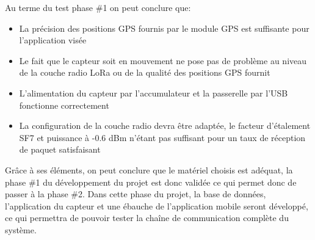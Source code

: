 Au terme du test phase \#1 on peut conclure que:

\begin{itemize}
\item La précision des positions GPS fournis par le module GPS est suffisante pour l'application visée
\item Le fait que le capteur soit en mouvement ne pose pas de problème au niveau de la couche radio LoRa ou de la qualité des positions GPS fournit
\item L'alimentation du capteur par l'accumulateur et la passerelle par l'USB fonctionne correctement
\item La configuration de la couche radio devra être adaptée, le facteur d'étalement SF7 et puissance à -0.6 dBm n'étant pas suffisant pour un taux de réception de paquet satisfaisant
\end{itemize}

Grâce à ses éléments, on peut conclure que le matériel choisis est adéquat, la phase \#1 du développement du projet est donc validée ce qui permet donc de passer à la phase \#2. Dans cette phase du projet, la base de données, l'application du capteur et une ébauche de l'application mobile seront développé, ce qui permettra de pouvoir tester la chaîne de communication complète du système.





